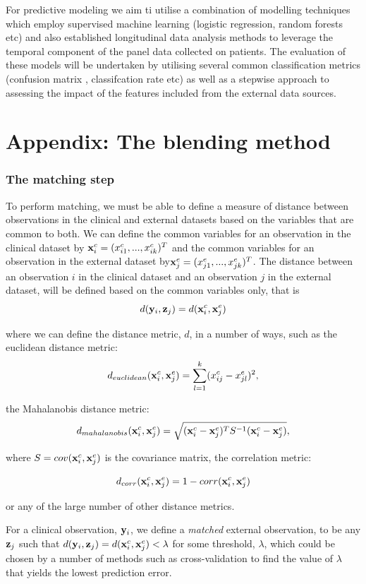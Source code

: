 \documentclass{article}
\begin{document}
For predictive modeling we aim ti utilise a combination of modelling techniques
which employ supervised machine learning (logistic regression, random forests etc) 
and also established longitudinal data analysis methods to leverage the temporal 
component of the panel data collected on patients. The evaluation of these 
models will be undertaken by utilising several common classification metrics (confusion matrix
, classifcation rate etc) as well as a stepwise approach to assessing the 
impact of the features included from the external data sources.

\section*{Appendix: The blending method}


\subsubsection*{The matching step}

To perform matching, we must be able to define a measure of distance between observations in the clinical and external datasets based on the variables that are common to both. We can define the common variables for an observation in the clinical dataset by ${\bf x}_i^c = (x_{i1}^c, ..., x_{ik}^c)^T$ and the common variables for an observation in the external dataset by${\bf x}_j^e = (x_{j1}^e, ..., x_{jk}^e)^T$. The distance between an observation $i$ in the clinical dataset and an observation $j$ in the external dataset, will be defined based on the common variables only, that is
$$d({\bf y}_i, {\bf z}_j) = d({\bf x}_i^c, {\bf x}_j^e)$$

where we can define the distance metric, $d$, in a number of ways, such as the euclidean distance metric:
$$d_{euclidean}({\bf x}_i^c, {\bf x}_j^e) = \sum_{l=1}^k(x_{ij}^c - x_{jl}^e)^2,$$

the Mahalanobis distance metric:
$$d_{mahalanobis}({\bf x}_i^c, {\bf x}_j^e) = \sqrt{({\bf x}_i^c - {\bf x}_j^e)^T S^{-1}({\bf x}_i^c - {\bf x}_j^e)},$$

where $S = cov({\bf x}_i^c, {\bf x}_j^e)$ is the covariance matrix, the correlation metric:

$$d_{corr}({\bf x}_i^c, {\bf x}_j^e) = 1 - corr({\bf x}_i^c, {\bf x}_j^e)$$

or any of the large number of other distance metrics.


For a clinical observation, ${\bf y}_i$, we define a \emph{matched} external observation, to be any ${\bf z}_j$ such that $d({\bf y}_i, {\bf z}_j) = d({\bf x}^c_i, {\bf x}^e_j) < \lambda$ for some threshold, $\lambda$, which could be chosen by a number of methods such as cross-validation to find the value of $\lambda$ that yields the lowest prediction error. 
\end{document}
